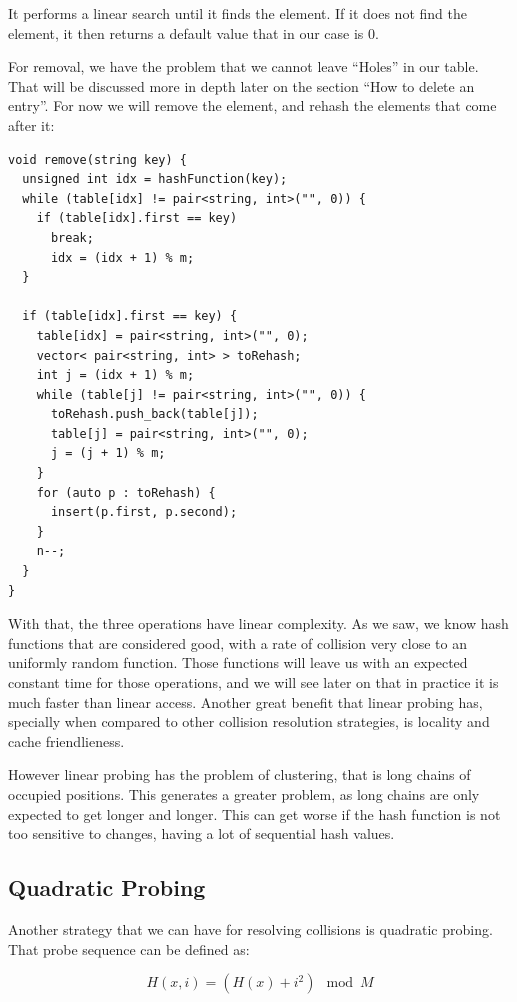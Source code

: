 It performs a linear search until it finds the element. If it does not find the element, it then returns a default value that in our case is 0. 

For removal, we have the problem that we cannot leave ``Holes'' in our table. That will be discussed more in depth later on the section ``How to delete an entry''. For now we will remove the element, and rehash the elements that come after it:

\begin{lstlisting}
void remove(string key) {
  unsigned int idx = hashFunction(key);
  while (table[idx] != pair<string, int>("", 0)) {
    if (table[idx].first == key) 
      break;
      idx = (idx + 1) % m;
  }
    
  if (table[idx].first == key) {
    table[idx] = pair<string, int>("", 0);
    vector< pair<string, int> > toRehash;
    int j = (idx + 1) % m;
    while (table[j] != pair<string, int>("", 0)) {
      toRehash.push_back(table[j]);
      table[j] = pair<string, int>("", 0);
      j = (j + 1) % m;
    }
    for (auto p : toRehash) {
      insert(p.first, p.second);
    }
    n--;
  }  
}
\end{lstlisting}

With that, the three operations have linear complexity. As we saw, we know hash functions that are considered good, with a rate of collision very close to an uniformly random function. Those functions will leave us with an expected constant time for those operations, and we will see later on that in practice it is much faster than linear access. Another great benefit that linear probing has, specially when compared to other collision resolution strategies, is locality and cache friendlieness.

However linear probing has the problem of clustering, that is long chains of occupied positions. This generates a greater problem, as long chains are only expected to get longer and longer. This can get worse if the hash function is not too sensitive to changes, having a lot of sequential hash values. 

\subsection{Quadratic Probing}

Another strategy that we can have for resolving collisions is quadratic probing. That probe sequence can be defined as:

\[ H(x, i) = (H(x) + i^2) \mod M \]

